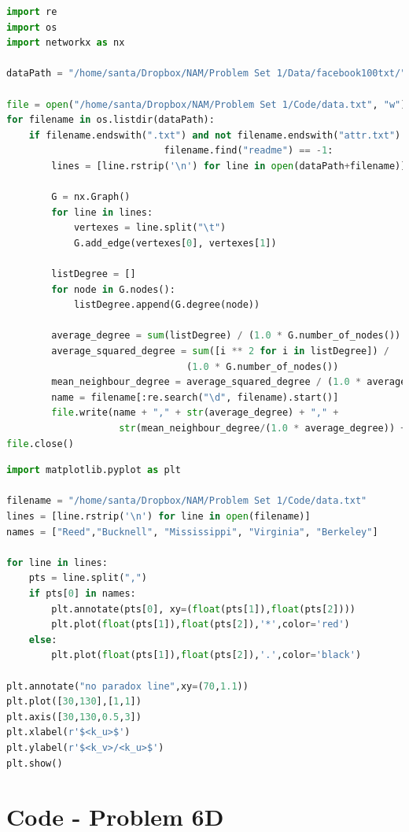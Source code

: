 \documentclass{article}
\begin{document}
\begin{lstlisting}[language=Python, caption=To write data to a file]
import re
import os
import networkx as nx

dataPath = "/home/santa/Dropbox/NAM/Problem Set 1/Data/facebook100txt/"

file = open("/home/santa/Dropbox/NAM/Problem Set 1/Code/data.txt", "w")
for filename in os.listdir(dataPath):
    if filename.endswith(".txt") and not filename.endswith("attr.txt") and 
    						filename.find("readme") == -1:
        lines = [line.rstrip('\n') for line in open(dataPath+filename)]
        
        G = nx.Graph()
        for line in lines:
            vertexes = line.split("\t")
            G.add_edge(vertexes[0], vertexes[1])
        
        listDegree = []
        for node in G.nodes():
            listDegree.append(G.degree(node))
        
        average_degree = sum(listDegree) / (1.0 * G.number_of_nodes())
        average_squared_degree = sum([i ** 2 for i in listDegree]) / 
        						(1.0 * G.number_of_nodes())
        mean_neighbour_degree = average_squared_degree / (1.0 * average_degree)
        name = filename[:re.search("\d", filename).start()]
        file.write(name + "," + str(average_degree) + "," + 
        			str(mean_neighbour_degree/(1.0 * average_degree)) + "\n")
file.close()
\end{lstlisting}
\bigskip

\begin{lstlisting}[language=Python, caption=To plot the data]
import matplotlib.pyplot as plt

filename = "/home/santa/Dropbox/NAM/Problem Set 1/Code/data.txt"
lines = [line.rstrip('\n') for line in open(filename)]
names = ["Reed","Bucknell", "Mississippi", "Virginia", "Berkeley"]

for line in lines:
    pts = line.split(",")
    if pts[0] in names:
        plt.annotate(pts[0], xy=(float(pts[1]),float(pts[2])))
        plt.plot(float(pts[1]),float(pts[2]),'*',color='red')
    else:
        plt.plot(float(pts[1]),float(pts[2]),'.',color='black')

plt.annotate("no paradox line",xy=(70,1.1))
plt.plot([30,130],[1,1])
plt.axis([30,130,0.5,3])
plt.xlabel(r'$<k_u>$')
plt.ylabel(r'$<k_v>/<k_u>$')
plt.show()
\end{lstlisting}

\newpage
\section*{Code - Problem 6D}
\end{document}

